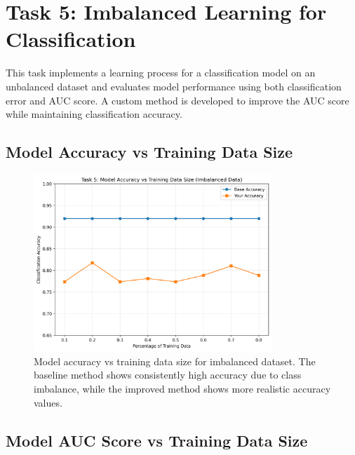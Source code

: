 \documentclass[letterpaper,11pt,twoside]{article}
\begin{document}
\newpage

\section{Task 5: Imbalanced Learning for Classification}

This task implements a learning process for a classification model on an unbalanced dataset and evaluates model performance using both classification error and AUC score. A custom method is developed to improve the AUC score while maintaining classification accuracy.

\subsection{Model Accuracy vs Training Data Size}

\begin{figure}[h]
    \centering
    \includegraphics[width=0.8\textwidth]{../Figures/Figure4.png}
    \caption{Model accuracy vs training data size for imbalanced dataset. The baseline method shows consistently high accuracy due to class imbalance, while the improved method shows more realistic accuracy values.}
    \label{fig:task5_acc}
\end{figure}

\newpage

\subsection{Model AUC Score vs Training Data Size}
\end{document}
